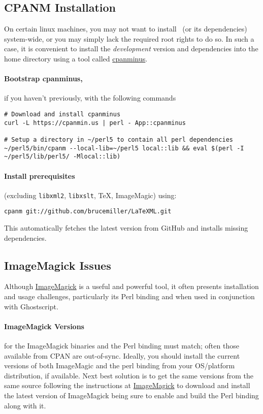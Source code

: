 \documentclass{article}
\begin{document}
\subsection{CPANM Installation}\label{get.cpanm}
On certain linux machines, you may not want to install \LaTeXML\ (or its dependencies)
system-wide, or you may simply lack the required root rights to do so. 
In such a case, it is convenient to install the \emph{development} version and 
dependencies into the home directory using a tool called 
\href{ https://github.com/miyagawa/cpanminus}{cpanminus}.

\paragraph*{Bootstrap cpanminus,} if you haven't previously,
with the following commands
\begin{lstlisting}[style=shell]
# Download and install cpanminus
curl -L https://cpanmin.us | perl - App::cpanminus

# Setup a directory in ~/perl5 to contain all perl dependencies
~/perl5/bin/cpanm --local-lib=~/perl5 local::lib && eval $(perl -I ~/perl5/lib/perl5/ -Mlocal::lib)
\end{lstlisting}

\paragraph*{Install prerequisites}
(excluding  \texttt{libxml2},  \texttt{libxslt}, \TeX, ImageMagic)
using:
\begin{lstlisting}[style=shell]
cpanm git://github.com/brucemiller/LaTeXML.git
\end{lstlisting}
This automatically fetches the latest version from GitHub and installs 
missing dependencies. 

\subsection{ImageMagick Issues}\label{get.imagemagick}
Although \href{https://imagemagick.com/}{ImageMagick} is a useful and powerful tool,
it often presents installation and usage challenges, particularly its Perl binding
and when used in conjunction with Ghostscript.

\paragraph*{ImageMagick Versions} for the ImageMagick binaries and the Perl binding must match;
often those available from CPAN are out-of-sync.
Ideally, you should install the current versions of both ImageMagic and the perl binding
from your OS/platform distribution, if available.
Next best solution is to get the same versions from the same source
following the instructions at \href{https://www.imagemagick.org/}{ImageMagick}
to download and install the latest version of ImageMagick being sure to enable
and build the Perl binding along with it.
\end{document}
